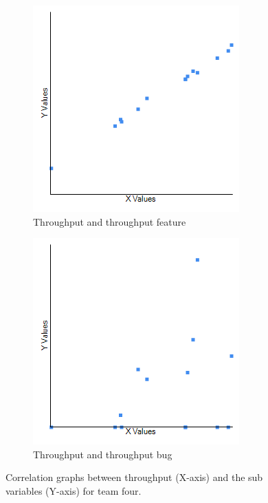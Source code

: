 \documentclass[UKenglish]{ifimaster}  %
\begin{document}
\begin{figure}[h] 
  \begin{subfigure}[b]{0.5\textwidth}
  \center
\includegraphics[scale=0.6]{Picture/Four/TPvsTPFT.png}
 \caption{Throughput and throughput feature} 
 \label{fig:a:4}
  \end{subfigure}
  \begin{subfigure}[b]{0.5\textwidth}
  \center
\includegraphics[scale=0.6]{Picture/Four/TPvsTPB.png}
 \caption{Throughput and throughput bug} 
\label{fig:b:4}
  \end{subfigure}
  \caption{Correlation graphs between throughput (X-axis) and the sub variables (Y-axis) for team four.}
\label{corr:Difference:4}
\end{figure}
\newpage
\end{document}
